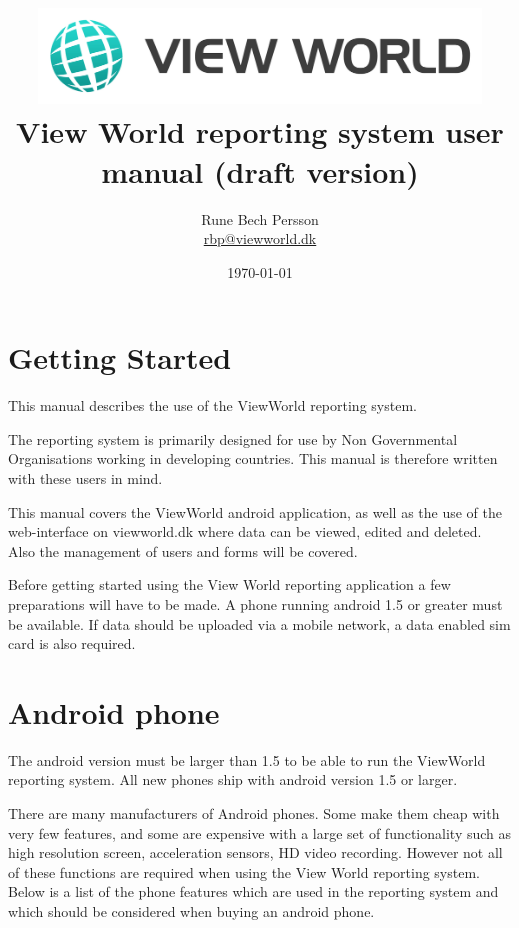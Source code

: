 \documentclass[a4paper, 12pt, final]{article}
\title{
  \includegraphics[height=1in]{View_World_Logo.jpg}\\
  View World reporting system user manual (draft version)
  }
\author{
  Rune Bech Persson\\
  \url{rbp@viewworld.dk}
}
\date{\today}
\begin{document}
\maketitle

\newpage

\tableofcontents

\newpage

\section{Getting Started}

This manual describes the use of the ViewWorld reporting system.

The reporting system is primarily designed for use by Non Governmental Organisations working in developing countries. This manual is therefore written with these users in mind.

This manual covers the ViewWorld android application, as well as the use of the web-interface on viewworld.dk where data can be viewed, edited and deleted. Also the management of users and forms will be covered.

Before getting started using the View World reporting application a few preparations will have to be made. A phone running android 1.5 or greater must be available. If data should be uploaded via a mobile network, a data enabled sim card is also required.

\section{Android phone}

The android version must be larger than 1.5 to be able to run the ViewWorld reporting system. All new phones ship with android version 1.5 or larger.

There are many manufacturers of Android phones. Some make them cheap with very few features, and some are expensive with a large set of functionality such as high resolution screen, acceleration sensors, HD video recording. However not all of these functions are required when using the View World reporting system. Below is a list of the phone features which are used in the reporting system and which should be considered when buying an android phone.
\end{document}
